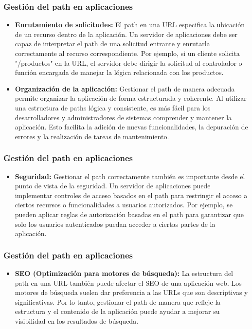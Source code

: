 \begin{frame}
	\frametitle{Gestión del path en aplicaciones}
	
	\begin{itemize}
		\item \textbf{Enrutamiento de solicitudes:} El path en una URL especifica la ubicación de un recurso dentro de la aplicación. Un servidor de aplicaciones debe ser capaz de interpretar el path de una solicitud entrante y enrutarla correctamente al recurso correspondiente. Por ejemplo, si un cliente solicita "/productos" en la URL, el servidor debe dirigir la solicitud al controlador o función encargada de manejar la lógica relacionada con los productos.
		
		\item \textbf{Organización de la aplicación:} Gestionar el path de manera adecuada permite organizar la aplicación de forma estructurada y coherente. Al utilizar una estructura de paths lógica y consistente, es más fácil para los desarrolladores y administradores de sistemas comprender y mantener la aplicación. Esto facilita la adición de nuevas funcionalidades, la depuración de errores y la realización de tareas de mantenimiento.
		
	\end{itemize}	
\end{frame}

\begin{frame}
	\frametitle{Gestión del path en aplicaciones}
	
	\begin{itemize}
		\item\textbf{ Seguridad:} Gestionar el path correctamente también es importante desde el punto de vista de la seguridad. Un servidor de aplicaciones puede implementar controles de acceso basados en el path para restringir el acceso a ciertos recursos o funcionalidades a usuarios autorizados. Por ejemplo, se pueden aplicar reglas de autorización basadas en el path para garantizar que solo los usuarios autenticados puedan acceder a ciertas partes de la aplicación.
		
	\end{itemize}	
\end{frame}

\begin{frame}
	\frametitle{Gestión del path en aplicaciones}
	
	\begin{itemize}
		\item \textbf{SEO (Optimización para motores de búsqueda):} La estructura del path en una URL también puede afectar el SEO de una aplicación web. Los motores de búsqueda suelen dar preferencia a las URLs que son descriptivas y significativas. Por lo tanto, gestionar el path de manera que refleje la estructura y el contenido de la aplicación puede ayudar a mejorar su visibilidad en los resultados de búsqueda.
		
	\end{itemize}	
\end{frame}
